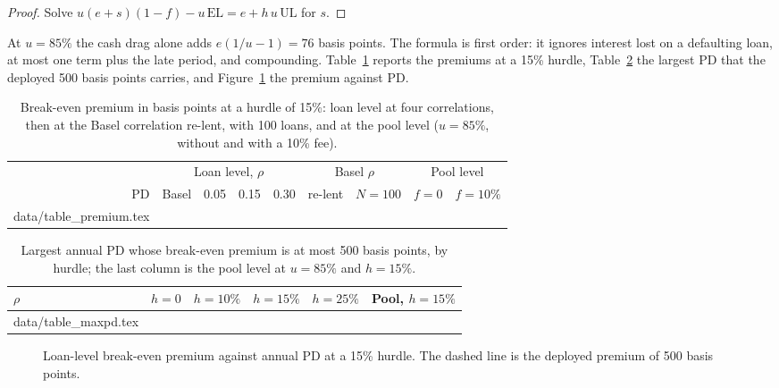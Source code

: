 \documentclass[11pt]{article}
\makeatletter
\theoremstyle{plain}
\theoremstyle{definition}
\newcommand{\inputrows}[1]{\@@input #1 }
\newcommand{\EL}{\mathrm{EL}}
\newcommand{\UL}{\mathrm{UL}}
\makeatother
\begin{document}
\begin{proof}
Solve $u(e+s)(1-f)-u\,\EL=e+h\,u\,\UL$ for $s$.
\end{proof}

At $u=85\%$ the cash drag alone adds $e(1/u-1)=76$ basis points. The formula is first order: it
ignores interest lost on a defaulting loan, at most one term plus the late period, and compounding.
Table~\ref{tab:premium} reports the premiums at a 15\% hurdle, Table~\ref{tab:maxpd} the largest PD
that the deployed 500 basis points carries, and Figure~\ref{fig:premium} the premium against PD.

\begin{table}[ht]
  \centering\small
  \caption{Break-even premium in basis points at a hurdle of 15\%: loan level at four correlations,
  then at the Basel correlation re-lent, with 100 loans, and at the pool level ($u=85\%$, without and
  with a 10\% fee).}
  \label{tab:premium}
  \begin{tabular}{rrrrrrrrr}
    \toprule
    & \multicolumn{4}{c}{Loan level, $\rho$} & \multicolumn{2}{c}{Basel $\rho$} & \multicolumn{2}{c}{Pool level} \\
    \cmidrule(lr){2-5}\cmidrule(lr){6-7}\cmidrule(lr){8-9}
    PD & Basel & 0.05 & 0.15 & 0.30 & re-lent & $N=100$ & $f=0$ & $f=10\%$ \\
    \midrule
    \inputrows{data/table_premium.tex}
    \bottomrule
  \end{tabular}
\end{table}

\begin{table}[ht]
  \centering\small
  \caption{Largest annual PD whose break-even premium is at most 500 basis points, by hurdle; the
  last column is the pool level at $u=85\%$ and $h=15\%$.}
  \label{tab:maxpd}
  \begin{tabular}{lrrrrr}
    \toprule
    $\rho$ & $h=0$ & $h=10\%$ & $h=15\%$ & $h=25\%$ & Pool, $h=15\%$ \\
    \midrule
    \inputrows{data/table_maxpd.tex}
    \bottomrule
  \end{tabular}
\end{table}

\begin{figure}[ht]
  \centering
  
  \caption{Loan-level break-even premium against annual PD at a 15\% hurdle. The dashed line is the
  deployed premium of 500 basis points.}
  \label{fig:premium}
\end{figure}
\end{document}
